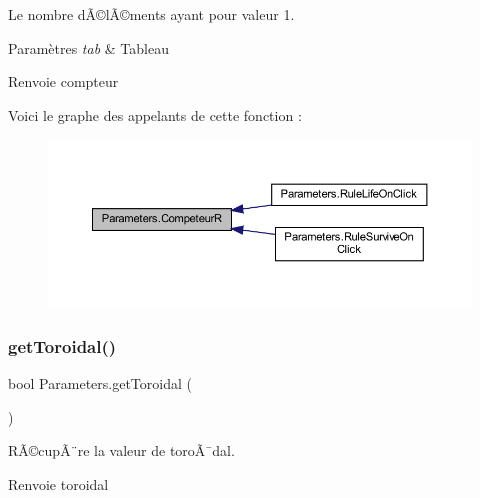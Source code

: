 Le nombre d\textquotesingle{}Ã©lÃ©ments ayant pour valeur 1. 


\begin{DoxyParams}{Paramètres}
{\em tab} & Tableau\\
\hline
\end{DoxyParams}
\begin{DoxyReturn}{Renvoie}
compteur
\end{DoxyReturn}
Voici le graphe des appelants de cette fonction \+:
\nopagebreak
\begin{figure}[H]
\begin{center}
\leavevmode
\includegraphics[width=350pt]{class_parameters_a9eb50f6a67cb480f303e5d6f91997f7d_icgraph}
\end{center}
\end{figure}
\mbox{\label{class_parameters_aa6714e2b56d3511340476f682a51e677}} 
\subsubsection{\texorpdfstring{get\+Toroidal()}{getToroidal()}}
{\footnotesize\ttfamily bool Parameters.\+get\+Toroidal (\begin{DoxyParamCaption}{ }\end{DoxyParamCaption})\hspace{0.3cm}{\ttfamily [inline]}}



RÃ©cupÃ¨re la valeur de toroÃ¯dal. 

\begin{DoxyReturn}{Renvoie}
toroidal
\end{DoxyReturn}
\mbox{\label{class_parameters_a5e16007361a29535bbad70f4f0a466bc}} 
